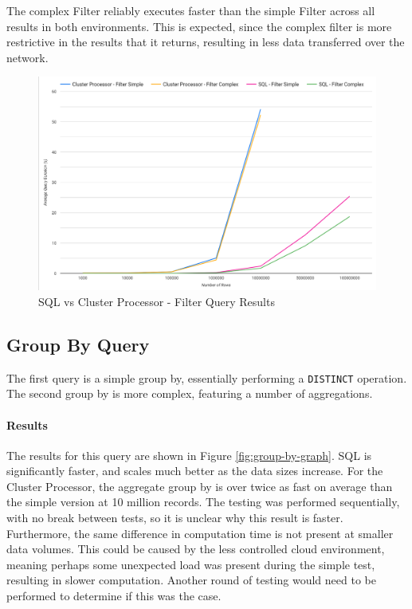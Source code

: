The complex Filter reliably executes faster than the simple Filter across all results in both environments.
This is expected, since the complex filter is more restrictive in the results that it returns, resulting in less data transferred over the network.

\begin{figure}[htp]
	\centering
	\includegraphics[width=0.8\linewidth]{chapters/diagrams/testing/filter-1k-100m}
	\caption{SQL vs Cluster Processor - Filter Query Results} 
	\label{fig:filter-graph}
\end{figure}

\subsection{Group By Query}
The first query is a simple group by, essentially performing a \texttt{DISTINCT} operation. 
The second group by is more complex, featuring a number of aggregations. %

\paragraph{Results}
The results for this query are shown in Figure \ref{fig:group-by-graph}. SQL is significantly faster, and scales much better as the data sizes increase. For the Cluster Processor, the aggregate group by is over twice as fast on average than the simple version at 10 million records. The testing was performed sequentially, with no break between tests, so it is unclear why this result is faster. Furthermore, the same difference in computation time is not present at smaller data volumes. This could be caused by the less controlled cloud environment, meaning perhaps some unexpected load was present during the simple test, resulting in slower computation. Another round of testing would need to be performed to determine if this was the case.

